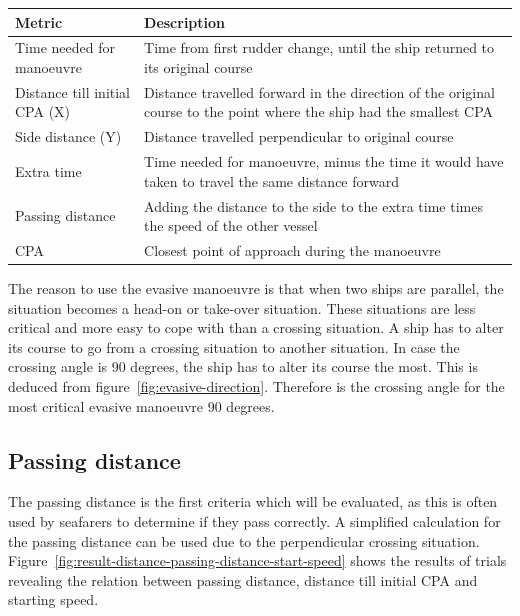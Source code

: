\begin{table}[ht]
	\begin{tabular}{p{}|p{}}
		\toprule
		Metric & Description\\
		\midrule
		Time needed for manoeuvre & Time from first rudder change, until the ship returned to its original course \\
		Distance till initial CPA (X) & Distance travelled forward in the direction of the original course to the point where the ship had the smallest CPA \\
		Side distance (Y) & Distance travelled perpendicular to original course\\
		Extra time & Time needed for manoeuvre, minus the time it would have taken to travel the same distance forward \\
		Passing distance & Adding the distance to the side to the extra time times the speed of the other vessel \\
		\ac{CPA} & Closest point of approach during the manoeuvre \\
		\bottomrule
	\end{tabular}
	
	\label{tab:evasive-manoeuvrer-metrics}
\end{table}

The reason to use the evasive manoeuvre is that when two ships are parallel, the situation becomes a head-on or take-over situation. These situations are less critical and more easy to cope with than a crossing situation. A ship has to alter its course to go from a crossing situation to another situation. In case the crossing angle is 90 degrees, the ship has to alter its course the most. This is deduced from figure~\ref{fig:evasive-direction}. Therefore is the crossing angle for the most critical evasive manoeuvre 90 degrees.

\subsection{Passing distance}
The passing distance is the first criteria which will be evaluated, as this is often used by seafarers to determine if they pass correctly. A simplified calculation for the passing distance can be used due to the perpendicular crossing situation. 
Figure~\ref{fig:result-distance-passing-distance-start-speed} shows the results of trials revealing the relation between passing distance, distance till initial CPA and starting speed.

